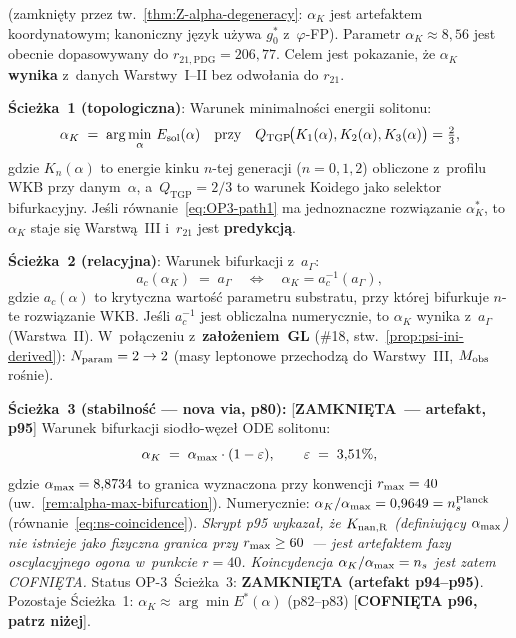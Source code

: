 \begin{problem}%
\label{prob:OP-3}
(zamkni\k{e}ty przez tw.~\ref{thm:Z-alpha-degeneracy}: $\alpha_K$ jest artefaktem
koordynatowym; kanoniczny j\k{e}zyk u\.zywa $g_0^*$ z~$\varphi$-FP).
Parametr $\alpha_K \approx 8{,}56$ jest obecnie dopasowywany do
$r_{21,\mathrm{PDG}} = 206{,}77$.
Celem jest pokazanie, \.ze $\alpha_K$ \textbf{wynika} z~danych Warstwy~I--II
bez odwo\l{}ania do $r_{21}$.

\medskip
\textbf{\'Scie\.zka~1 (topologiczna)}: Warunek minimalno\'sci energii solitonu:
\begin{equation}\label{eq:OP3-path1}
  \alpha_K \;=\; \arg\min_{\alpha}\, E_{\rm sol}(\alpha)
  \quad\text{przy}\quad
  Q_{\mathrm{TGP}}\!\bigl(K_1(\alpha),K_2(\alpha),K_3(\alpha)\bigr) = \tfrac{2}{3},
\end{equation}
gdzie $K_n(\alpha)$ to energie kinku $n$-tej generacji ($n=0,1,2$) obliczone
z~profilu WKB przy danym~$\alpha$, a~$Q_{\mathrm{TGP}} = 2/3$
to warunek Koidego jako selektor bifurkacyjny.
Je\'sli r\'ownanie~\eqref{eq:OP3-path1} ma jednoznaczne rozwi\k{a}zanie
$\alpha_K^*$, to $\alpha_K$ staje si\k{e} Warstw\k{a}~III
i~$r_{21}$ jest \textbf{predykcj\k{a}}.

\medskip
\textbf{\'Scie\.zka~2 (relacyjna)}: Warunek bifurkacji z~$a_\Gamma$:
\begin{equation}\label{eq:OP3-path2}
  a_c(\alpha_K) \;=\; a_\Gamma
  \quad \Leftrightarrow \quad
  \alpha_K = a_c^{-1}(a_\Gamma),
\end{equation}
gdzie $a_c(\alpha)$ to krytyczna warto\'s\'c parametru substratu,
przy kt\'orej bifurkuje $n$-te rozwi\k{a}zanie WKB.
Je\'sli $a_c^{-1}$ jest obliczalna numerycznie, to $\alpha_K$
wynika z~$a_\Gamma$ (Warstwa~II).
W~po\l{}\k{a}czeniu z~\textbf{za\l{}o\.zeniem~GL} (\#18,
stw.~\ref{prop:psi-ini-derived}): $N_{\rm param} = 2 \to 2$ (masy leptonowe
przechodz\k{a} do Warstwy~III, $M_{\rm obs}$ ro\'snie).

\medskip
\textbf{\'Scie\.zka~3 (stabilno\'s\'c --- nova via, p80):} [\textbf{ZAMKNI\k{E}TA~--- artefakt, p95}]
Warunek bifurkacji siod\l{}o-w\k{e}ze\l{} ODE solitonu:
\begin{equation}\label{eq:OP3-path3}
  \alpha_K \;=\; \alpha_{\rm max} \cdot (1 - \varepsilon),
  \qquad
  \varepsilon \;=\; 3{,}51\%,
\end{equation}
gdzie $\alpha_{\rm max} = 8{,}8734$ to granica wyznaczona przy konwencji $r_{\rm max}=40$
(uw.~\ref{rem:alpha-max-bifurcation}).
Numerycznie: $\alpha_K/\alpha_{\rm max} = 0{,}9649 = n_s^{\rm Planck}$
(r\'ownanie~\eqref{eq:ns-coincidence}).
\emph{Skrypt p95 wykaza\l{}, \.ze $K_{\rm nan,R}$ (definiuj\k{a}cy $\alpha_{\rm max}$)
nie istnieje jako fizyczna granica przy $r_{\rm max}\geq 60$~--- jest artefaktem
fazy oscylacyjnego ogona w~punkcie $r=40$.
Koincydencja $\alpha_K/\alpha_{\rm max} = n_s$ jest zatem COFNI\k{E}TA.}
Status OP-3~\'Scie\.zka~3: \textbf{ZAMKNI\k{E}TA (artefakt p94--p95)}.
Pozostaje \'Scie\.zka~1: $\alpha_K \approx \arg\min E^*(\alpha)$ (p82--p83)
[\textbf{COFNI\k{E}TA p96, patrz ni\.zej}].


\end{problem}
